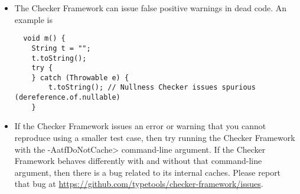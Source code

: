 \begin{itemize}
\begin{smaller}
\begin{Verbatim}
public String(char value[], @IndexFor("value") int offset, @IndexOrHigh("value") int count) { ... }
\end{Verbatim}
\end{smaller}

\noindent
you will get an error such as

\begin{smaller}
\begin{Verbatim}[]
[expression.unparsable] Expression in dependent type annotation invalid:
Use "#1" rather than "value"
\end{Verbatim}
\end{smaller}

Section~\ref{java-expressions-as-arguments} explains that you need to use
a different syntax to refer to a formal parameter:

\begin{smaller}
\begin{Verbatim}
public String(char value[], @IndexFor("#1") int offset, @IndexOrHigh("#1") int count) { ... }
\end{Verbatim}
\end{smaller}


\item
\label{false-positive-in-dead-code}
  The Checker Framework can issue false positive warnings in dead code.  An
  example is

\begin{smaller}
\begin{Verbatim}
  void m() {
    String t = "";
    t.toString();
    try {
    } catch (Throwable e) {
        t.toString(); // Nullness Checker issues spurious (dereference.of.nullable)
    }
\end{Verbatim}
\end{smaller}

\item
  If the Checker Framework issues an error or warning that you cannot
  reproduce using a smaller test case, then try running the Checker
  Framework with the \<-AatfDoNotCache> command-line argument.  If the
  Checker Framework behaves differently with and without that command-line
  argument, then there is a bug related to its internal caches.  Please
  report that bug at
  \url{https://github.com/typetools/checker-framework/issues}.

\end{itemize}


